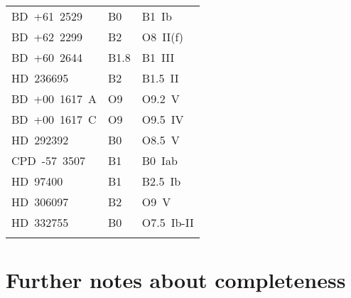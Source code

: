 \documentclass{aa}
\begin{document}
\begin{appendix}
\begin{table}[h]
\begin{tabular}{lll}
        BD~+61~2529  & B0 & B1~Ib \\\smallskip
        BD~+62~2299  & B2 & O8~II(f) \\\smallskip
        BD~+60~2644  & B1.8 & B1~III \\\smallskip
        HD~236695    & B2 & B1.5~II \\\smallskip
        BD~+00~1617~A& O9 & O9.2~V \\\smallskip
        BD~+00~1617~C& O9 & O9.5~IV \\\smallskip
        HD~292392    & B0 & O8.5~V \\\smallskip
        CPD~-57~3507 & B1 & B0~Iab \\\smallskip
        HD~97400     & B1 & B2.5~Ib \\\smallskip
        HD~306097    & B2 & O9~V \\\smallskip
        HD~332755    & B0 & O7.5~Ib-II \\
        \noalign{\smallskip}\hline
    \end{tabular}
\end{table}

\FloatBarrier


\section{Further notes about completeness}
\label{apen.completeness}


\end{appendix}
\end{document}
